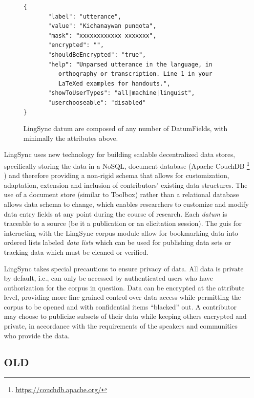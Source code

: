 \documentclass[11pt]{article}
\begin{document}
\begin{figure}[h]
\scriptsize
\begin{verbatim}
{
       "label": "utterance",
       "value": "Kichanaywan punqota",
       "mask": "xxxxxxxxxxxx xxxxxxx",
       "encrypted": "",
       "shouldBeEncrypted": "true",
       "help": "Unparsed utterance in the language, in 
          orthography or transcription. Line 1 in your 
          LaTeXed examples for handouts.",
       "showToUserTypes": "all|machine|linguist",
       "userchooseable": "disabled"
}
\end{verbatim}

\caption{LingSync datum are composed of any number of DatumFields, with
minimally the attributes above.}
\label{lingsync-datastructure}
\end{figure}

LingSync uses new technology for building scalable decentralized data stores,
specifically storing the data in a NoSQL, document database (Apache CouchDB%
\footnote{\url{https://couchdb.apache.org/}}%
) and therefore providing a non-rigid schema that allows for customization,
adaptation, extension and inclusion of contributors' existing data structures.
The use of a document store (similar to Toolbox) rather than a relational
database allows data schema to change, which enables researchers to customize
and modify data entry fields at any point during the course of research. Each
\emph{datum} is traceable to a source (be it a publication or an elicitation
session). The \glspl{gui} for interacting with the LingSync corpus module allow for
bookmarking data into ordered lists labeled \textit{data lists} which can be
used for publishing data sets or tracking data which must be cleaned or
verified.

LingSync takes special precautions to ensure privacy of data. All data is
private by default, i.e., can only be accessed by authenticated users who have
authorization for the corpus in question. Data can be encrypted at the
attribute level, providing more fine-grained control over data access while
permitting the corpus to be opened and with confidential items ``blacked'' out.
A contributor may choose to publicize subsets of their data while keeping
others encrypted and private, in accordance with the requirements of the
speakers and communities who provide the data.



\subsection{OLD}
\end{document}
